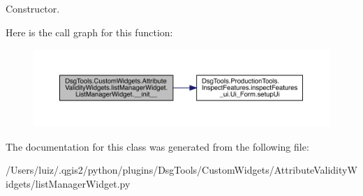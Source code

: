 \begin{DoxyVerb}Constructor.\end{DoxyVerb}
 Here is the call graph for this function\+:
\nopagebreak
\begin{figure}[H]
\begin{center}
\leavevmode
\includegraphics[width=350pt]{class_dsg_tools_1_1_custom_widgets_1_1_attribute_validity_widgets_1_1list_manager_widget_1_1_list_manager_widget_a328fba41262688c764a6f255f573fa37_cgraph}
\end{center}
\end{figure}


The documentation for this class was generated from the following file\+:\begin{DoxyCompactItemize}
\item 
/\+Users/luiz/.\+qgis2/python/plugins/\+Dsg\+Tools/\+Custom\+Widgets/\+Attribute\+Validity\+Widgets/list\+Manager\+Widget.\+py\end{DoxyCompactItemize}
